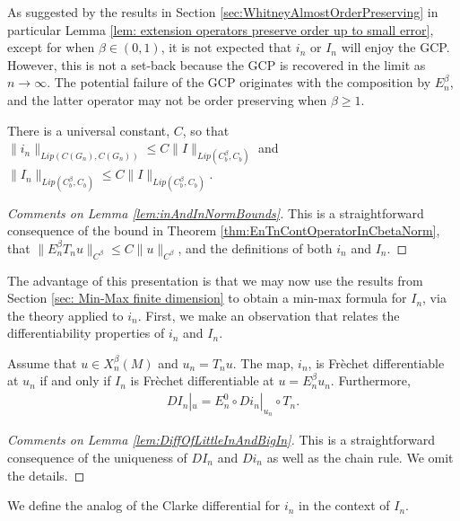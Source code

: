 \documentclass[11pt,reqno]{amsart}
\numberwithin{equation}{section}
\theoremstyle{plain}
\newcommand{\norm}[1]{\lVert#1\rVert}
\begin{document}
\begin{rem}
	As suggested by the results in Section \ref{sec:WhitneyAlmostOrderPreserving} in particular Lemma \ref{lem: extension operators preserve order up to small error}, except for when $\beta\in (0,1)$, it is not expected that $i_n$ or $I_n$ will enjoy the GCP.  However, this is not a set-back because the GCP is recovered in the limit as $n\to\infty$.  The potential failure of the GCP originates with the composition by $E_n^\beta$, and the latter operator may not be order preserving when $\beta\geq 1$.
\end{rem}


\begin{lem}\label{lem:inAndInNormBounds}
	There is a universal constant, $C$, so that $\norm{i_n}_{Lip(C(G_n),C(G_n))}\leq C\norm{I}_{Lip(C^\beta_b,C_b)}$ and $\norm{I_n}_{Lip(C^\beta_b,C_b)}\leq C\norm{I}_{Lip(C^\beta_b,C_b)}$.
\end{lem}

\begin{proof}[Comments on Lemma \ref{lem:inAndInNormBounds}]
	This is a straightforward consequence of the bound in Theorem \ref{thm:EnTnContOperatorInCbetaNorm}, that $\norm{E_n^\beta T_n u}_{C^\beta}\leq C\norm{u}_{C^\beta}$, and the definitions of both $i_n$ and $I_n$.
\end{proof}


The advantage of this presentation is that we may now use the results from Section \ref{sec: Min-Max finite dimension} to obtain a min-max formula for $I_n$, via the theory applied to $i_n$.  First, we make an observation that relates the differentiability properties of $i_n$ and $I_n$.

\begin{lem}\label{lem:DiffOfLittleInAndBigIn}
	Assume that $u\in X^\beta_n(M)$ and $u_n=T_nu$.  The map, $i_n$, is Fr\`echet differentiable at $u_n$ if and only if $I_n$ is Fr\`echet differentiable at $u=E_n^\beta u_n$.  Furthermore,
	\begin{align*}
		DI_n|_u = E_n^0\circ Di_n|_{u_n}\circ T_n.
	\end{align*}
\end{lem}

\begin{proof}[Comments on Lemma \ref{lem:DiffOfLittleInAndBigIn}]
	This is a straightforward consequence of the uniqueness of $DI_n$ and $Di_n$ as well as the chain rule.  We omit the details.
\end{proof}

We define the analog of the Clarke differential for $i_n$ in the context of $I_n$.
\end{document}
